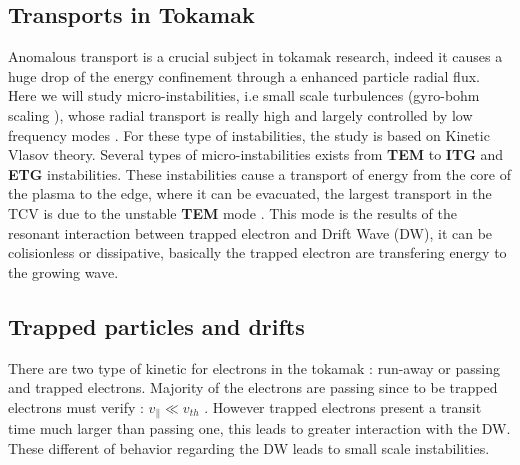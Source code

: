 \documentclass[11pt,a4paper,openany]{report}
\begin{document}
\begin{multicols}{2}
    \section{Transports in Tokamak}
    Anomalous transport is a crucial subject in tokamak research, indeed it causes a huge drop of the energy confinement through a enhanced particle radial flux. Here we will study micro-instabilities, i.e small scale turbulences (gyro-bohm scaling \cite{Scaling_TEM}), whose radial transport is really high and largely controlled by low frequency modes \cite{DW_transport}. For these type of instabilities, the study is based on Kinetic Vlasov theory.
    Several types of micro-instabilities exists from \textbf{TEM} to \textbf{ITG} and \textbf{ETG} instabilities. These instabilities cause a transport of energy from the core of the plasma to the edge, where it can be evacuated, the largest transport in the TCV is due to the unstable \textbf{TEM} mode \cite{Krutkin_thesis,TEM_slow}. This mode is the results of the resonant interaction between trapped electron and Drift Wave (DW), it can be colisionless or dissipative, basically the trapped electron are transfering energy to the growing wave.
    \subsection{Trapped particles and drifts}

    There are two type of kinetic for electrons in the tokamak : run-away  or passing and trapped electrons. Majority of the electrons are passing since to be trapped electrons must verify  : $v_\parallel \ll v_{th}$ \cite{book_banana}\cite{Banana_distr_runaway}. However trapped electrons present a transit time much larger than passing one, this leads to greater interaction with the DW.
    These different of behavior regarding the DW leads to small scale instabilities.

\end{multicols}
\end{document}
